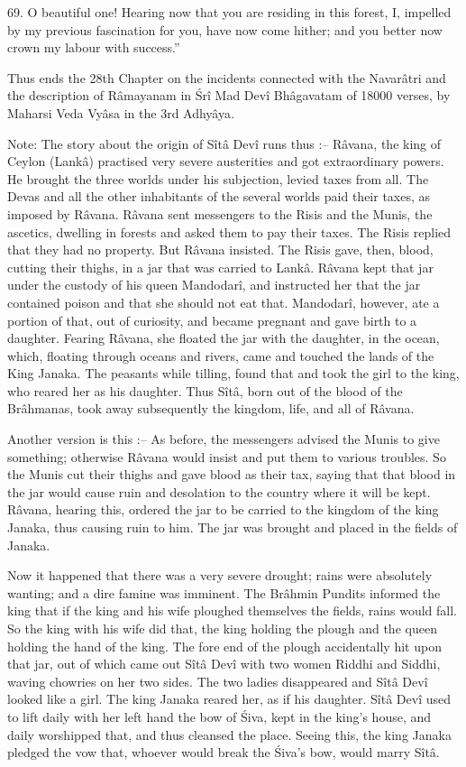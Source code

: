 69. O beautiful one! Hearing now that you are residing in this forest, I, impelled by my previous fascination for you, have now come hither; and you better now crown my labour with success.''

Thus ends the 28th Chapter on the incidents connected with the Navar\^atri and the description of R\^amayanam in \'Sr\^i Mad Dev\^i Bh\^agavatam of 18000 verses, by Maharsi Veda Vy\^asa in the 3rd Adhy\^aya.

Note: The story about the origin of S\^it\^a Dev\^i runs thus :-- R\^avana, the king of Ceylon (Lank\^a) practised very severe austerities and got extraordinary powers. He brought the three worlds under his subjection, levied taxes from all. The Devas and all the other inhabitants of the several worlds paid their taxes, as imposed by R\^avana. R\^avana sent messengers to the Risis and the Munis, the ascetics, dwelling in forests and asked them to pay their taxes. The Risis replied that they had no property. But R\^avana insisted. The Risis gave, then, blood, cutting their thighs, in a jar that was carried to Lank\^a. R\^avana kept that jar under the custody of his queen Mandodar\^i, and instructed her that the jar contained poison and that she should not eat that. Mandodar\^i, however, ate a portion of that, out of curiosity, and became pregnant and gave birth to a daughter. Fearing R\^avana, she floated the jar with the daughter, in the ocean, which, floating through oceans and rivers, came and touched the lands of the King Janaka. The peasants while tilling, found that and took the girl to the king, who reared her as his daughter. Thus S\^it\^a, born out of the blood of the Br\^ahmanas, took away subsequently the kingdom, life, and all of R\^avana.

Another version is this :-- As before, the messengers advised the Munis to give something; otherwise R\^avana would insist and put them to various troubles. So the Munis cut their thighs and gave blood as their tax, saying that that blood in the jar would cause ruin and desolation to the country where it will be kept. R\^avana, hearing this, ordered the jar to be carried to the kingdom of the king Janaka, thus causing ruin to him. The jar was brought and placed in the fields of Janaka.

Now it happened that there was a very severe drought; rains were absolutely wanting; and a dire famine was imminent. The Br\^ahmin Pundits informed the king that if the king and his wife ploughed themselves the fields, rains would fall. So the king with his wife did that, the king holding the plough and the queen holding the hand of the king. The fore end of the plough accidentally hit upon that jar, out of which came out S\^it\^a Dev\^i with two women Riddhi and Siddhi, waving chowries on her two sides. The two ladies disappeared and S\^it\^a Dev\^i looked like a girl. The king Janaka reared her, as if his daughter. S\^it\^a Dev\^i used to lift daily with her left hand the bow of \'Siva, kept in the king's house, and daily worshipped that, and thus cleansed the place. Seeing this, the king Janaka pledged the vow that, whoever would break the \'Siva's bow, would marry S\^it\^a.